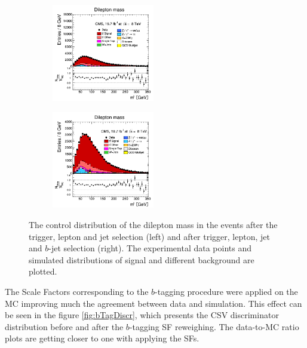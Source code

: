 \begin{itemize}
 \begin{figure}[h]
 \centering
 \begin{subfigure}
   \centering
   \includegraphics[width=0.49\textwidth]{04_event_reconstruction/plots/mll_step5.png}
 \end{subfigure}
 \begin{subfigure}
   \centering
   \includegraphics[width=0.49\textwidth]{04_event_reconstruction/plots/mll_step6.png}
 \end{subfigure}
 \caption{The control distribution of the dilepton mass in the events after the trigger, lepton and jet selection (left) and after trigger, lepton, jet and $b$-jet selection (right). 
 The experimental data points and simulated distributions of signal and different background are plotted.}
 \label{fig:mllbJetSel}
 \end{figure}
 
 The Scale Factors corresponding to the $b$-tagging procedure were applied on the MC improving much the agreement between data and simulation. This effect can be seen in the 
 figure \ref{fig:bTagDiscr}, which presents the CSV discriminator distribution before and after the $b$-tagging SF reweighing. The data-to-MC ratio plots are getting closer to one with
 applying the SFs.
 

\end{itemize}
